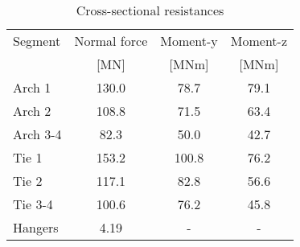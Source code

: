 \begin{table}[H] 
\caption{Cross-sectional resistances}
\centering
\begin{tabular}{lccc}
\hline
Segment & Normal force & Moment-y & Moment-z \\
 & [MN]   & [MNm] & [MNm] \\ \hline
Arch 1 & \SI{130.0}{} & \SI{78.7}{} & \SI{79.1}{}\\
Arch 2 & \SI{108.8}{} & \SI{71.5}{} & \SI{63.4}{}\\
Arch 3-4 & \SI{82.3}{} & \SI{50.0}{} & \SI{42.7}{}\\
Tie 1 & \SI{153.2}{} & \SI{100.8}{} & \SI{76.2}{}\\
Tie 2 & \SI{117.1}{} & \SI{82.8}{} & \SI{56.6}{}\\
Tie 3-4 & \SI{100.6}{} & \SI{76.2}{} & \SI{45.8}{}\\
Hangers & 4.19 & - & - \\\hline
\end{tabular}
\end{table}